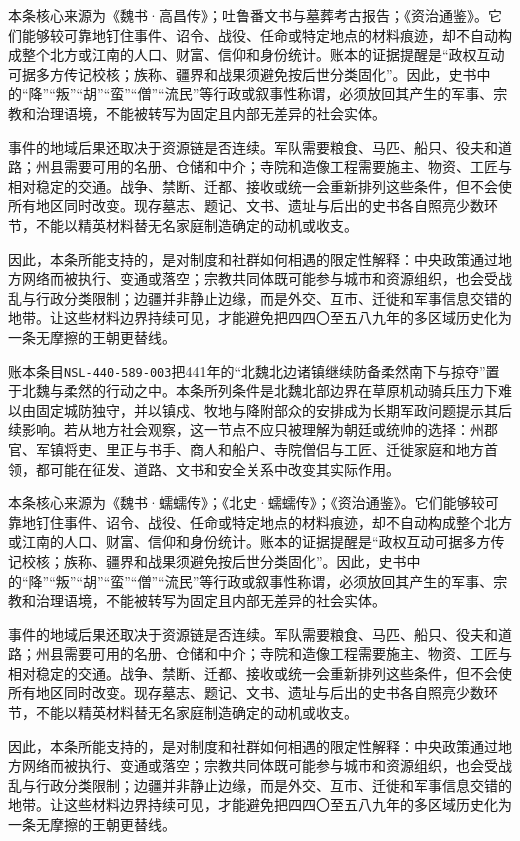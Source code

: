 本条核心来源为《魏书·高昌传》；吐鲁番文书与墓葬考古报告；《资治通鉴》。它们能够较可靠地钉住事件、诏令、战役、任命或特定地点的材料痕迹，却不自动构成整个北方或江南的人口、财富、信仰和身份统计。账本的证据提醒是“政权互动可据多方传记校核；族称、疆界和战果须避免按后世分类固化”。因此，史书中的“降”“叛”“胡”“蛮”“僧”“流民”等行政或叙事性称谓，必须放回其产生的军事、宗教和治理语境，不能被转写为固定且内部无差异的社会实体。

事件的地域后果还取决于资源链是否连续。军队需要粮食、马匹、船只、役夫和道路；州县需要可用的名册、仓储和中介；寺院和造像工程需要施主、物资、工匠与相对稳定的交通。战争、禁断、迁都、接收或统一会重新排列这些条件，但不会使所有地区同时改变。现存墓志、题记、文书、遗址与后出的史书各自照亮少数环节，不能以精英材料替无名家庭制造确定的动机或收支。

因此，本条所能支持的，是对制度和社群如何相遇的限定性解释：中央政策通过地方网络而被执行、变通或落空；宗教共同体既可能参与城市和资源组织，也会受战乱与行政分类限制；边疆并非静止边缘，而是外交、互市、迁徙和军事信息交错的地带。让这些材料边界持续可见，才能避免把四四〇至五八九年的多区域历史化为一条无摩擦的王朝更替线。

账本条目\texttt{NSL-440-589-003}把441年的“北魏北边诸镇继续防备柔然南下与掠夺”置于北魏与柔然的行动之中。本条所列条件是北魏北部边界在草原机动骑兵压力下难以由固定城防独守，并以镇戍、牧地与降附部众的安排成为长期军政问题提示其后续影响。若从地方社会观察，这一节点不应只被理解为朝廷或统帅的选择：州郡官、军镇将吏、里正与书手、商人和船户、寺院僧侣与工匠、迁徙家庭和地方首领，都可能在征发、道路、文书和安全关系中改变其实际作用。

本条核心来源为《魏书·蠕蠕传》；《北史·蠕蠕传》；《资治通鉴》。它们能够较可靠地钉住事件、诏令、战役、任命或特定地点的材料痕迹，却不自动构成整个北方或江南的人口、财富、信仰和身份统计。账本的证据提醒是“政权互动可据多方传记校核；族称、疆界和战果须避免按后世分类固化”。因此，史书中的“降”“叛”“胡”“蛮”“僧”“流民”等行政或叙事性称谓，必须放回其产生的军事、宗教和治理语境，不能被转写为固定且内部无差异的社会实体。

事件的地域后果还取决于资源链是否连续。军队需要粮食、马匹、船只、役夫和道路；州县需要可用的名册、仓储和中介；寺院和造像工程需要施主、物资、工匠与相对稳定的交通。战争、禁断、迁都、接收或统一会重新排列这些条件，但不会使所有地区同时改变。现存墓志、题记、文书、遗址与后出的史书各自照亮少数环节，不能以精英材料替无名家庭制造确定的动机或收支。

因此，本条所能支持的，是对制度和社群如何相遇的限定性解释：中央政策通过地方网络而被执行、变通或落空；宗教共同体既可能参与城市和资源组织，也会受战乱与行政分类限制；边疆并非静止边缘，而是外交、互市、迁徙和军事信息交错的地带。让这些材料边界持续可见，才能避免把四四〇至五八九年的多区域历史化为一条无摩擦的王朝更替线。

